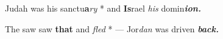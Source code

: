 \begin{multicols}{2}
	Judah was his sanctu\textbf{a}\textit{ry} * and \textbf{Is}rael \textit{his} domin\textbf{\textit{ion.}}
	
	The saw saw \textbf{that} and \textit{fled} * --- Jor\textit{dan} was driven \textbf{\textit{back.}}
\end{multicols}